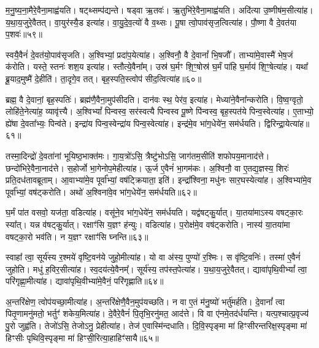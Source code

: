 म॒नु॒ष्य॒ना॒मैरे॒वैना॒माह्व॑यति। 
षट्थ्सम्प॑द्यन्ते। 
षड्वा ऋ॒तवः॑। 
ऋ॒तुभि॑रे॒वैना॒माह्व॑यति। 
अदि॑त्या उ॒ष्णीष॑म॒सीत्या॑ह। 
य॒था॒य॒जुरे॒वै\-तत्। 
वा॒युर॑स्यै॒ड इत्या॑ह। 
वा॒यु॒दे॒व॒त्यो॑ वै व॒थ्सः। 
पू॒षा त्वो॒पाव॑सृज॒\-त्वित्या॑ह। 
पौ॒ष्णा वै दे॒वत॑या प॒शवः॑॥५९॥

स्वयै॒वैनं॑ दे॒वत॑यो॒पाव॑सृजति। 
अ॒श्विभ्यां॒ प्रदा॑प॒येत्या॑ह। 
अ॒श्विनौ॒ वै दे॒वानां᳚ भि॒षजौ᳚। 
ताभ्या॑मे॒वास्मै॑ भेष॒जं क॑रोति। 
यस्ते॒ स्तनः॑ शश॒य इत्या॑ह। 
स्तौत्ये॒वैना᳚म्। 
उस्र॑ घ॒र्मꣳ शि॒ꣳ॒षोस्र॑ घ॒र्मं पा॑हि घ॒र्माय॑ शि॒ꣳ॒षेत्या॑ह। 
यथा᳚ ब्रू॒याद॒मुष्मै॑ दे॒हीति॑। 
ता॒दृगे॒व तत्। 
बृह॒स्पति॒स्त्वोप॑ सीद॒त्वित्या॑ह॥६०॥

ब्रह्म॒ वै दे॒वानां॒ बृह॒स्पतिः॑। 
ब्रह्म॑णै॒वैना॒मुप॑सीदति। 
दान॑वः स्थ॒ पेर॑व॒ इत्या॑ह। 
मेध्या॑ने॒वैना᳚न्करोति। 
वि॒ष्व॒ग्वृतो॒ लोहि॑ते॒नेत्या॑ह॒ व्यावृ॑त्त्यै। 
अ॒श्विभ्यां᳚ पिन्वस्व॒ सर॑स्वत्यै पिन्वस्व पू॒ष्णे पि॑न्वस्व॒ बृह॒स्पत॑ये पिन्व॒स्वेत्या॑ह। 
ए॒ताभ्यो॒ ह्ये॑षा दे॒वता᳚भ्यः॒ पिन्व॑ते। 
इन्द्रा॑य पिन्व॒स्वेन्द्रा॑य पिन्व॒स्वेत्या॑ह। 
इन्द्र॑मे॒व भा॑ग॒धेये॑न॒ सम॑र्धयति। 
द्विरिन्द्रा॒येत्या॑ह॥६१॥

तस्मा॒दिन्द्रो॑ दे॒वता॑नां भूयिष्ठ॒भाक्त॑मः। 
गा॒य॒त्रो॑ऽसि॒ त्रैष्टु॑भोऽसि॒ जाग॑तम॒सीति॑ शफोपय॒मानाद॑त्ते। 
छन्दो॑भि\-रे॒वैना॒नाद॑त्ते। 
स॒होर्जो भा॒गेनोप॒मेहीत्या॑ह। 
ऊ॒र्ज ए॒वैनं॑ भा॒गम॑कः। 
अ॒श्विनौ॒ वा ए॒तद्य॒ज्ञस्य॒ शिरः॑ प्रति॒दध॑तावब्रूताम्। 
आ॒वाभ्या॑मे॒व पूर्वा᳚भ्यां॒ वष॑ट्क्रियाता॒ इति॑। 
इन्द्रा᳚श्विना॒ मधु॑नः सार॒घस्येत्या॑ह। 
अ॒श्विभ्या॑मे॒व पूर्वा᳚भ्यां॒ वष॑ट्करोति। 
अथो॑ अ॒श्विना॑वे॒व भा॑ग॒धेये॑न॒ सम॑र्धयति॥६२॥

घ॒र्मं पा॑त वसवो॒ यज॑ता॒ वडित्या॑ह। 
वसू॑ने॒व भा॑ग॒धेये॑न॒ सम॑र्धयति। 
यद्व॑षट्कु॒र्यात्। 
या॒तया॑माऽस्य वषट्का॒रः स्या᳚त्। 
यन्न व॑षट्कु॒र्यात्। 
रक्षाꣳ॑सि य॒ज्ञꣳ ह॑न्युः। 
वडित्या॑ह। 
प॒रोक्ष॑मे॒व वष॑ट्करोति। 
नास्य॑ या॒तया॑मा वषट्का॒रो भव॑ति। 
न य॒ज्ञꣳ रक्षाꣳ॑सि घ्नन्ति॥६३॥

स्वाहा᳚ त्वा॒ सूर्य॑स्य र॒श्मये॑ वृष्टि॒वन॑ये जुहो॒मीत्या॑ह। 
यो वा अ॑स्य॒ पुण्यो॑ र॒श्मिः। 
स वृ॑ष्टि॒वनिः॑। 
तस्मा॑ ए॒वैनं॑ जुहोति। 
मधु॑ ह॒विर॒सीत्या॑ह। 
स्व॒दय॑त्ये॒वैनम्᳚। 
सूर्य॑स्य॒ तप॑स्त॒पेत्या॑ह। 
य॒था॒य॒जुरे॒वैतत्। 
द्यावा॑पृथि॒वीभ्यां᳚ त्वा॒ परि॑गृह्णा॒मीत्या॑ह। 
द्यावा॑पृथि॒वीभ्या॑मे॒वैनं॒ परि॑गृह्णाति॥६४॥

अ॒न्तरि॑क्षेण॒ त्वोप॑यच्छा॒मीत्या॑ह। 
अ॒न्तरि॑क्षेणै॒वैन॒मुप॑यच्छति। 
न वा ए॒तं म॑नु॒ष्यो॑ भर्तु॑मर्\mbox{}हति। 
दे॒वानां᳚ त्वा पितृ॒णामनु॑मतो॒ भर्तुꣳ॑ शकेय॒मित्या॑ह। 
दे॒वैरे॒वैनं॑ पि॒तृभि॒रनु॑मत॒ आद॑त्ते। 
वि वा ए॑नमे॒तद॑र्धयन्ति। 
यत्प॒श्चात्प्र॒वृज्य॑ पु॒रो जुह्व॑ति। 
तेजो॑ऽसि॒ तेजोऽनु॒ प्रेहीत्या॑ह। 
तेज॑ ए॒वास्मि॑न्दधाति। 
दि॒वि॒स्पृङ्मा मा॑ हिꣳसीरन्तरिक्ष॒स्पृङ्मा मा॑ हिꣳसीः पृथिवि॒स्पृङ्मा मा॑ हिꣳसी॒रित्या॒हाहिꣳ॑सायै॥६५॥

